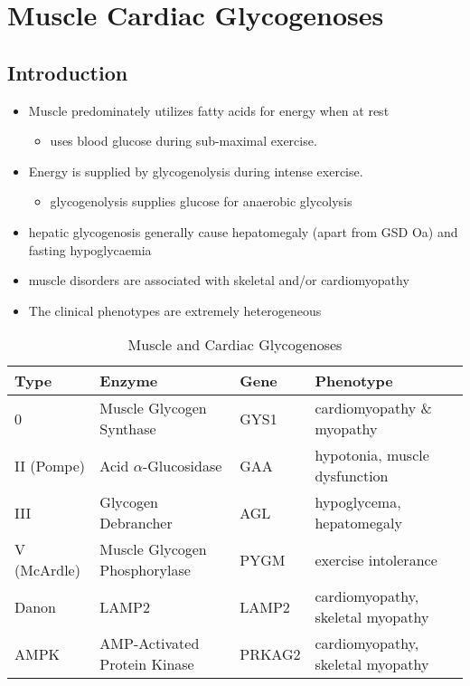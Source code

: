 \documentclass{scrartcl}
\begin{document}
\section{Muscle Cardiac Glycogenoses}
\label{sec:orgaea37ca}
\subsection{Introduction}
\label{sec:org149c838}
\begin{itemize}
\item Muscle predominately utilizes fatty acids for energy when at rest
\begin{itemize}
\item uses blood glucose during sub-maximal exercise.
\end{itemize}
\item Energy is supplied by glycogenolysis during intense exercise.
\begin{itemize}
\item glycogenolysis supplies glucose for anaerobic glycolysis
\end{itemize}
\item hepatic glycogenosis generally cause hepatomegaly (apart from GSD
Oa) and fasting hypoglycaemia
\item muscle disorders are associated with skeletal and/or
cardiomyopathy
\item The clinical phenotypes are extremely heterogeneous
\end{itemize}

\begin{table}[htbp]
\caption{\label{tab:org0bc80e2}
Muscle and Cardiac Glycogenoses}
\centering
\begin{tabular}{llll}
Type & Enzyme & Gene & Phenotype\\
\hline
0 & Muscle Glycogen Synthase & GYS1 & cardiomyopathy \& myopathy\\
II (Pompe) & Acid \(\alpha\)-Glucosidase & GAA & hypotonia, muscle dysfunction\\
III & Glycogen Debrancher & AGL & hypoglycema, hepatomegaly\\
V (McArdle) & Muscle Glycogen Phosphorylase & PYGM & exercise intolerance\\
Danon & LAMP2 & LAMP2 & cardiomyopathy, \textpm{} skeletal myopathy\\
AMPK & AMP-Activated Protein Kinase & PRKAG2 & cardiomyopathy, \textpm{} skeletal myopathy\\
\end{tabular}
\end{table}
\end{document}
